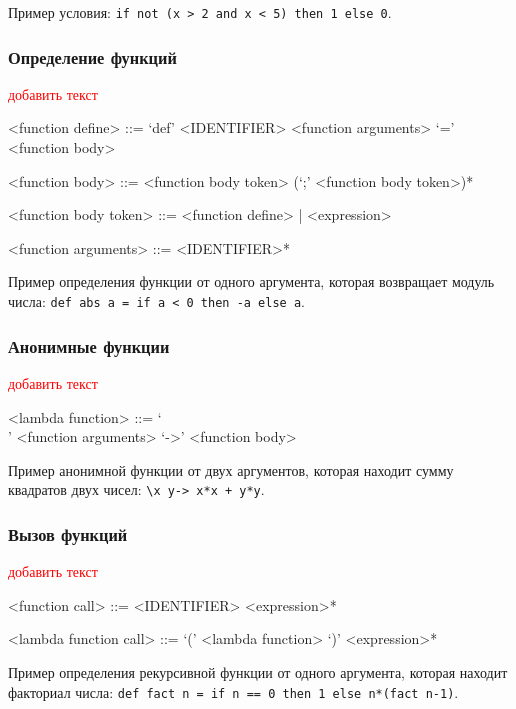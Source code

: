 \documentclass[12pt,a4paper,oneside]{extarticle}
\begin{document}
            Пример условия: \lstinline$if not (x > 2 and x < 5) then 1 else 0$.

        \subsubsection{Определение функций}
            \textcolor{red}{добавить текст}
            \begin{grammar}
                <function define> ::= `def' <IDENTIFIER> <function arguments> `=' <function body>

                <function body> ::= <function body token> (`;' <function body token>)*

                <function body token> ::= <function define> | <expression>

                <function arguments> ::= <IDENTIFIER>*
            \end{grammar}

            Пример определения функции от одного аргумента, которая возвращает модуль числа: \lstinline$def abs a = if a < 0 then -a else a$.

        \subsubsection{Анонимные функции}
            \textcolor{red}{добавить текст}
            \begin{grammar}
                <lambda function> ::= `\\' <function arguments> `->' <function body>
            \end{grammar}

            Пример анонимной функции от двух аргументов, которая находит сумму квадратов двух чисел: \lstinline$\x y-> x*x + y*y$.

        \subsubsection{Вызов функций}
            \textcolor{red}{добавить текст}

            \begin{grammar}
                <function call> ::= <IDENTIFIER> <expression>*

                <lambda function call> ::= `(' <lambda function> `)' <expression>*
            \end{grammar}

            Пример определения рекурсивной функции от одного аргумента, которая находит факториал числа: \lstinline$def fact n = if n == 0 then 1 else n*(fact n-1)$.
\end{document}
